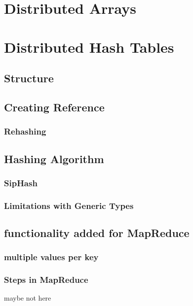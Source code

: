 \section{Distributed Arrays}
\newpage


\section{Distributed Hash Tables}
\subsection{Structure}
\subsection{Creating Reference}
\subsubsection{Rehashing}
\subsection{Hashing Algorithm}
\subsubsection{SipHash}
\subsubsection{Limitations with Generic Types}
\subsection{functionality added for MapReduce}
\subsubsection{multiple values per key}
\subsubsection{Steps in MapReduce}
maybe not here







